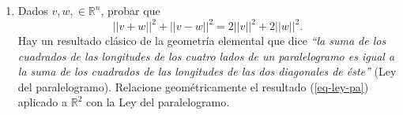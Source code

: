 \documentclass[11pt,spanish,makeidx,reqno]{amsbook}
\begin{document}
\begin{enumerate}
\
	
\item Dados $v, w,\in \mathbb R^n$, probar que
\begin{equation} \label{eq-ley-pa}
||v + w||^2  + ||v - w||^2= 2||v||^2 + 2||w||^2 . \tag{*}
\end{equation}
Hay un resultado  clásico de la geometría elemental que dice \textit{``la suma de los cuadrados de las longitudes de los cuatro lados de un paralelogramo es igual a la suma de los cuadrados de las longitudes de las dos diagonales de éste''} (Ley del paralelogramo). Relacione geométricamente el  resultado (\ref{eq-ley-pa}) aplicado  a $\mathbb R^2$  con  la Ley del paralelogramo.


\begin{comment}
	content

\item Hallar la distancia y el punto que realiza la distancia.
\begin{enumerate}
	\item  entre recta $R_2$ y el  punto $Q=(4,3,2)$.
	\item entre plano $\pi_1$ y el punto $Q=(1,1,1)$.
\end{enumerate}

\

\item
Demostrar las siguientes proposiciones.
\begin{enumerate}
	\item ${X} . (Y \times Z)=\det\left(\begin{smallmatrix} X\\Y\\Z\end{smallmatrix}\right)=
	\det \left(\begin{smallmatrix}
	x_1&x_2&x_3\\
	y_1&y_2&y_3\\
	z_1&z_2&z_3
	\end{smallmatrix}\right)$.
	\item $||{X} \times {Y}||^2 = ||X||^2||Y||^2 - (X.Y)^2$.
	\item $||X \times Y|| =||X||\,||Y||\, \sen(\theta)$ donde $\theta$ es el
	\'angulo entre $X$ e $Y$.
	\item $X \times Y=0$ si y s\'olo si $X$ e $Y$ son paralelos.
\end{enumerate}

\end{comment}



\end{enumerate}
\end{document}
